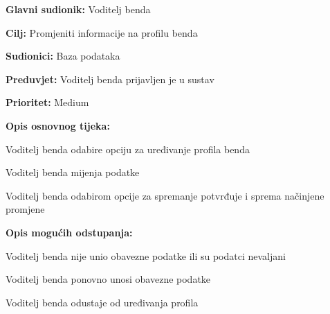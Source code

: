 \noindent {}
	\begin{packed_item}
		
		\item \textbf{Glavni sudionik:} Voditelj benda
		\item \textbf{Cilj:} Promjeniti informacije na profilu benda
		\item \textbf{Sudionici:} Baza podataka
		\item \textbf{Preduvjet:} Voditelj benda prijavljen je u sustav
		\item \textbf{Prioritet:} Medium
		\item \textbf{Opis osnovnog tijeka:} 
		
		\item[] \begin{packed_enum}
			
			\item Voditelj benda odabire opciju za uređivanje profila benda
			\item Voditelj benda mijenja podatke
			\item Voditelj benda odabirom opcije za spremanje potvrđuje i sprema načinjene promjene
		\end{packed_enum} 
	
		\item  \textbf{Opis mogućih odstupanja:}
		\item[] \begin{packed_item}
			
			\item[3.a] Voditelj benda nije unio obavezne podatke ili su podatci nevaljani
			\item[] \begin{packed_enum}
				\item Voditelj benda ponovno unosi obavezne podatke
				\item Voditelj benda odustaje od uređivanja profila
			\end{packed_enum}	
			
		\end{packed_item} 
	
	\end{packed_item}

